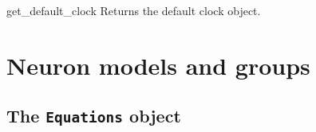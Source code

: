 \documentclass[letterpaper,10pt,english]{manual}
\begin{document}
\hypertarget{brian.get_default_clock}{}\begin{funcdesc}{get\_default\_clock}{}
Returns the default clock object.
\end{funcdesc}

\resetcurrentobjects
\hypertarget{--doc-reference-models-and-groups}{}

\hypertarget{index-92}{}\section{Neuron models and groups}

\hypertarget{index-93}{}\subsection{The \texttt{Equations} object}
\end{document}
